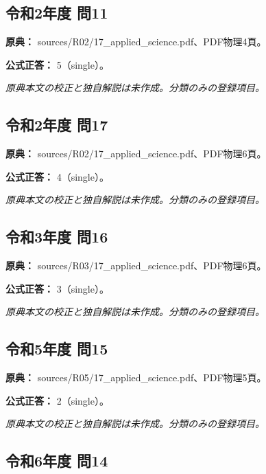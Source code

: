 \subsection{令和2年度 問11}
\label{q:r02-reg-applied-11}

\noindent\textbf{原典：} sources/R02/17\_applied\_science.pdf、PDF物理4頁。

\textbf{公式正答：} 5（single）。

\par\textit{原典本文の校正と独自解説は未作成。分類のみの登録項目。}

\subsection{令和2年度 問17}
\label{q:r02-reg-applied-17}

\noindent\textbf{原典：} sources/R02/17\_applied\_science.pdf、PDF物理6頁。

\textbf{公式正答：} 4（single）。

\par\textit{原典本文の校正と独自解説は未作成。分類のみの登録項目。}

\subsection{令和3年度 問16}
\label{q:r03-reg-applied-16}

\noindent\textbf{原典：} sources/R03/17\_applied\_science.pdf、PDF物理6頁。

\textbf{公式正答：} 3（single）。

\par\textit{原典本文の校正と独自解説は未作成。分類のみの登録項目。}

\subsection{令和5年度 問15}
\label{q:r05-reg-applied-15}

\noindent\textbf{原典：} sources/R05/17\_applied\_science.pdf、PDF物理5頁。

\textbf{公式正答：} 2（single）。

\par\textit{原典本文の校正と独自解説は未作成。分類のみの登録項目。}

\subsection{令和6年度 問14}
\label{q:r06-reg-applied-14}


